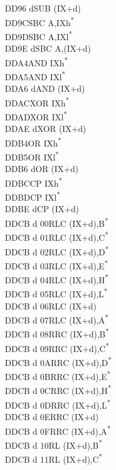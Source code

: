 \documentclass[oneside,a4paper]{book}
\begin{document}
\begin{multicols}{3}
{\begin{tabbing}
DD96 d\>SUB (IX+d)\\
DD9C\>SBC A,IXh\textsuperscript{*}\\
DD9D\>SBC A,IXl\textsuperscript{*}\\
DD9E d\>SBC A,(IX+d)\\
DDA4\>AND IXh\textsuperscript{*}\\
DDA5\>AND IXl\textsuperscript{*}\\
DDA6 d\>AND (IX+d)\\
DDAC\>XOR IXh\textsuperscript{*}\\
DDAD\>XOR IXl\textsuperscript{*}\\
DDAE d\>XOR (IX+d)\\
DDB4\>OR IXh\textsuperscript{*}\\
DDB5\>OR IXl\textsuperscript{*}\\
DDB6 d\>OR (IX+d)\\
DDBC\>CP IXh\textsuperscript{*}\\
DDBD\>CP IXl\textsuperscript{*}\\
DDBE d\>CP (IX+d)\\
DDCB d 00\>RLC (IX+d),B\textsuperscript{*}\\
DDCB d 01\>RLC (IX+d),C\textsuperscript{*}\\
DDCB d 02\>RLC (IX+d),D\textsuperscript{*}\\
DDCB d 03\>RLC (IX+d),E\textsuperscript{*}\\
DDCB d 04\>RLC (IX+d),H\textsuperscript{*}\\
DDCB d 05\>RLC (IX+d),L\textsuperscript{*}\\
DDCB d 06\>RLC (IX+d)\\
DDCB d 07\>RLC (IX+d),A\textsuperscript{*}\\
DDCB d 08\>RRC (IX+d),B\textsuperscript{*}\\
DDCB d 09\>RRC (IX+d),C\textsuperscript{*}\\
DDCB d 0A\>RRC (IX+d),D\textsuperscript{*}\\
DDCB d 0B\>RRC (IX+d),E\textsuperscript{*}\\
DDCB d 0C\>RRC (IX+d),H\textsuperscript{*}\\
DDCB d 0D\>RRC (IX+d),L\textsuperscript{*}\\
DDCB d 0E\>RRC (IX+d)\\
DDCB d 0F\>RRC (IX+d),A\textsuperscript{*}\\
DDCB d 10\>RL (IX+d),B\textsuperscript{*}\\
DDCB d 11\>RL (IX+d),C\textsuperscript{*}\\

\end{tabbing}}
\end{multicols}
\end{document}
